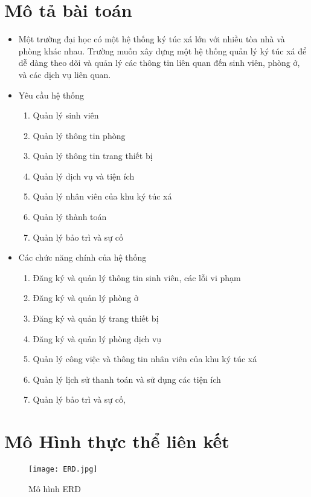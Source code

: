 \documentclass[a4paper,12pt]{article}
\begin{document}
\section{Mô tả bài toán}
\begin{itemize}
    \item Một trường đại học có một hệ thống ký túc xá lớn với nhiều tòa nhà và phòng khác nhau. Trường muốn xây dựng một hệ thống quản lý ký túc xá để dễ dàng theo dõi và quản lý các thông tin liên quan đến sinh viên, phòng ở, và các dịch vụ liên quan.
    \item Yêu cầu hệ thống
    \begin{enumerate}
        \item Quản lý sinh viên
        \item Quản lý thông tin phòng
        \item Quản lý thông tin trang thiết bị
        \item Quản lý dịch vụ và tiện ích
        \item Quản lý nhân viên của khu ký túc xá
        \item Quản lý thành toán
        \item Quản lý bảo trì và sự cố
    
    \end{enumerate}
    \item Các chức năng chính của hệ thống
    \begin{enumerate}
        \item Đăng ký và quản lý thông tin sinh viên, các lỗi vi phạm
        \item Đăng ký và quản lý phòng ở
        \item Đăng ký và quản lý trang thiết bị
        \item Đăng ký và quản lý phòng dịch vụ
        \item Quản lý công việc và thông tin nhân viên của khu ký túc xá
        \item Quản lý lịch sử thanh toán và sử dụng các tiện ích
        \item Quản lý bảo trì và sự cố,
    \end{enumerate}
\end{itemize}
\newpage
\section{Mô Hình thực thể liên kết}
\begin{figure}[tbh]
    \centering
    \texttt{[image: ERD.jpg]} %
    \caption{Mô hình ERD}
    \label{ERD}
\end{figure}
\end{document}
